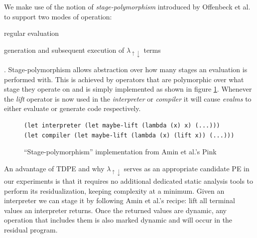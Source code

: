 \documentclass[a4paper,12pt,twoside,openright]{report}
\theoremstyle{definition}
\newcommand{\mslang}{$\lambda_{\uparrow\downarrow}$}
\begin{document}
We make use of the notion of \textit{stage-polymorphism} introduced by Offenbeck et al. \cite{ofenbeck2017staging} to support two modes of operation:
\begin{enumerate*}[label=(\arabic*)]
	\item regular evaluation
	\item generation and subsequent execution of \mslang{} terms
\end{enumerate*}.
Stage-polymorphism allows abstraction over how many stages an evaluation is performed with. This is achieved by operators that are polymorphic over what stage they operate on and is simply implemented as shown in figure \ref{lst:stage_poly_ex}. Whenever the \textit{lift} operator is now used in the \textit{interpreter} or \textit{compiler} it will cause \textit{evalms} to either evaluate or generate code respectively.

\begin{figure}[ht]
\centering
\begin{verbatim}
(let interpreter (let maybe-lift (lambda (x) x) (...)))
(let compiler (let maybe-lift (lambda (x) (lift x)) (...)))
\end{verbatim}
\caption{``Stage-polymorphism'' implementation from Amin et al.'s Pink \cite{amin2017collapsing}}
\label{lst:stage_poly_ex}
\end{figure}

An advantage of TDPE and why \mslang{} serves as an appropriate candidate PE in our experiments is that it requires no additional dedicated static analysis tools to perform its residualization, keeping complexity at a minimum. Given an interpreter we can stage it by following Amin et al.'s \cite{amin2017collapsing} recipe: lift all terminal values an interpreter returns. Once the returned values are dynamic, any operation that includes them is also marked dynamic and will occur in the residual program.

\end{document}
